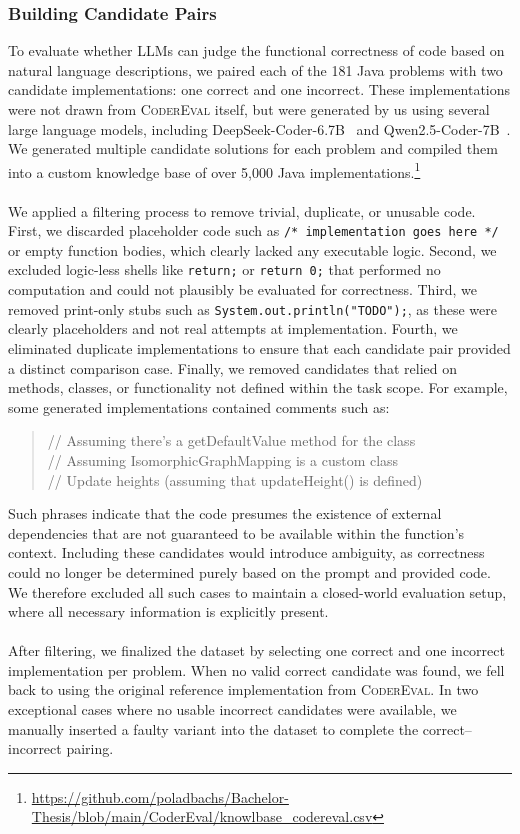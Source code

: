 \documentclass[a4paper]{usiinfbachelorproject}
\begin{document}
\subsubsection{Building Candidate Pairs}\label{sec:judgments}
To evaluate whether LLMs can judge the functional correctness of code based on natural language descriptions, we paired each of the 181 Java problems with two candidate implementations: one correct and one incorrect. These implementations were not drawn from \textsc{CoderEval} itself, but were generated by us using several large language models, including DeepSeek-Coder-6.7B~\cite{deepseek2024report} and Qwen2.5-Coder-7B~\cite{qwen2024report}. We generated multiple candidate solutions for each problem and compiled them into a custom knowledge base of over 5,000 Java implementations.\footnote{\url{https://github.com/poladbachs/Bachelor-Thesis/blob/main/CoderEval/knowlbase_codereval.csv}}\\
\\[2pt]
We applied a filtering process to remove trivial, duplicate, or unusable code. First, we discarded placeholder code such as \texttt{/* implementation goes here */} or empty function bodies, which clearly lacked any executable logic. Second, we excluded logic-less shells like \texttt{return;} or \texttt{return 0;} that performed no computation and could not plausibly be evaluated for correctness. Third, we removed print-only stubs such as \texttt{System.out.println("TODO");}, as these were clearly placeholders and not real attempts at implementation. Fourth, we eliminated duplicate implementations to ensure that each candidate pair provided a distinct comparison case. Finally, we removed candidates that relied on methods, classes, or functionality not defined within the task scope. For example, some generated implementations contained comments such as:
\begin{quote}\ttfamily\small
// Assuming there's a getDefaultValue method for the class\\
// Assuming IsomorphicGraphMapping is a custom class\\
// Update heights (assuming that updateHeight() is defined)
\end{quote}
Such phrases indicate that the code presumes the existence of external dependencies that are not guaranteed to be available within the function's context. Including these candidates would introduce ambiguity, as correctness could no longer be determined purely based on the prompt and provided code. We therefore excluded all such cases to maintain a closed-world evaluation setup, where all necessary information is explicitly present.\\
\\[2pt]
After filtering, we finalized the dataset by selecting one correct and one incorrect implementation per problem. When no valid correct candidate was found, we fell back to using the original reference implementation from \textsc{CoderEval}. In two exceptional cases where no usable incorrect candidates were available, we manually inserted a faulty variant into the dataset to complete the correct–incorrect pairing.
\end{document}
